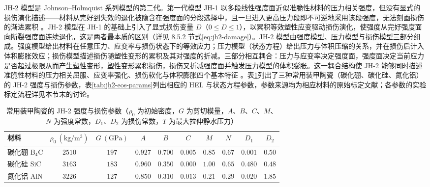JH-2 模型是 Johnson--Holmquist 系列模型的第二代。第一代模型 JH-1 以多段线性强度面近似准脆性材料的压力相关强度，但没有显式的损伤演化描述——材料从完好到失效的退化被隐含在强度面的分段选择中，且一旦进入更高压力段即不可逆地采用该段强度，无法刻画损伤的渐进累积 \cite{JohnsonHolmquist1994}。JH-2 模型在 JH-1 的基础上引入了显式损伤变量 $D$（$0\le D\le1$），以累积等效塑性应变驱动损伤演化，使强度从完好强度面向断裂强度面连续退化，这是两者最本质的区别（详见 8.5.2 节式\eqref{eq:jh2-damage}）。JH-2 模型由强度模型、压力模型与损伤模型三部分组成。强度模型给出材料在任意压力、应变率与损伤状态下的等效应力；压力模型（状态方程）给出压力与体积压缩的关系，并在损伤后计入体积膨胀效应；损伤模型描述损伤随塑性变形的累积及其对强度的折减。三部分相互耦合：压力与应变率决定强度面，强度面决定当前应力是否超过极限从而产生塑性变形，塑性变形累积损伤，损伤又折减强度面并触发压力模型的体积膨胀。这一耦合结构使 JH-2 能够同时描述准脆性材料的压力相关屈服、应变率强化、损伤软化与体积膨胀四个基本特征 \cite{JohnsonHolmquist1994}。表\ref{tab:jh2-strength-params}列出了三种常用装甲陶瓷（碳化硼、碳化硅、氮化铝）的 JH-2 强度与损伤参数，表\ref{tab:jh2-eos-params}列出相应的 HEL 与状态方程参数，参数来源均为相应材料的原始标定文献；各参数的实验标定流程详见本节末的讨论。

\begin{table}[htbp]
  \centering
  \small
  \caption{常用装甲陶瓷的 JH-2 强度与损伤参数（$\rho_{0}$ 为初始密度，$G$ 为剪切模量，$A$、$B$、$C$、$M$、$N$ 为强度常数，$D_{1}$、$D_{2}$ 为损伤常数，$T$ 为最大拉伸静水压力）\cite{JohnsonHolmquist1999,HolmquistJohnson2002,HolmquistTempletonBishnoi2001}}
  \label{tab:jh2-strength-params}
  \begin{tabular}{lccccccccc}
    \toprule
    材料 & $\rho_{0}~(\mathrm{kg/m^{3}})$ & $G~(\mathrm{GPa})$ & $A$ & $B$ & $C$ & $M$ & $N$ & $D_{1}$ & $D_{2}$ \\
    \midrule
    碳化硼 B$_{4}$C & $2510$ & $197$ & $0.927$ & $0.700$ & $0.005$ & $0.85$ & $0.67$ & $0.001$ & $0.50$ \\
    碳化硅 SiC & $3163$ & $183$ & $0.960$ & $0.350$ & $0.000$ & $1.00$ & $0.65$ & $0.480$ & $0.48$ \\
    氮化铝 AlN & $3226$ & $127$ & $0.850$ & $0.310$ & $0.013$ & $0.21$ & $0.29$ & $0.020$ & $1.85$ \\
    \bottomrule
  \end{tabular}
\end{table}

